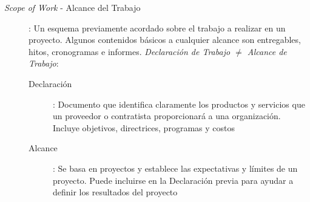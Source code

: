 \begin{description}
    \item[\textit{Scope of Work} - Alcance del Trabajo]{ : Un esquema previamente acordado sobre el trabajo a realizar en un proyecto. Algunos contenidos básicos a cualquier alcance son entregables, hitos, cronogramas e informes. \textit{Declaración de Trabajo ${\neq}$ Alcance de Trabajo}:
    \begin{description}
        \item[Declaración]{ : Documento que identifica claramente los productos y servicios que un proveedor o contratista proporcionará a una organización. Incluye objetivos, directrices, programas y costos}
        \item[Alcance]{ : Se basa en proyectos y establece las expectativas y límites de un proyecto. Puede incluirse en la Declaración previa para ayudar a definir los resultados del proyecto}
    \end{description}}
\end{description}

\newpage